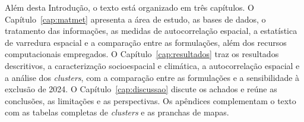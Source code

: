 Além desta Introdução, o texto está organizado em três capítulos. O Capítulo~\ref{cap:matmet} apresenta a área de estudo, as bases de dados, o tratamento das informações, as medidas de autocorrelação espacial, a estatística de varredura espacial e a comparação entre as formulações, além dos recursos computacionais empregados. O Capítulo~\ref{cap:resultados} traz os resultados descritivos, a caracterização socioespacial e climática, a autocorrelação espacial e a análise dos \textit{clusters}, com a comparação entre as formulações e a sensibilidade à exclusão de 2024. O Capítulo~\ref{cap:discussao} discute os achados e reúne as conclusões, as limitações e as perspectivas. Os apêndices complementam o texto com as tabelas completas de \textit{clusters} e as pranchas de mapas.

